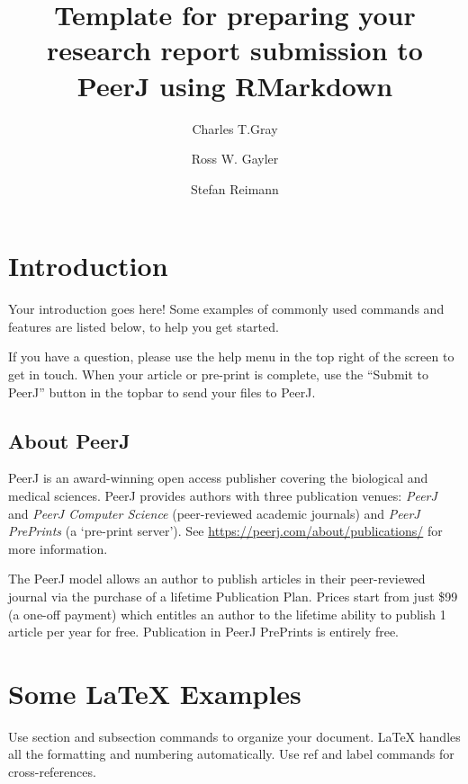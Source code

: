 \documentclass[fleqn,10pt,lineno]{wlpeerj} %
\title{Template for preparing your research report submission to PeerJ using RMarkdown}
\author[1]{Charles T.Gray}
\author[2]{Ross W. Gayler}
\author[3]{Stefan Reimann}
\affil[1]{Charles' institution address, Australia}
\affil[2]{www.rossgayler.com}
\affil[3]{Stefan's institution address, Switzerland}
\begin{document}
\flushbottom
\maketitle
\thispagestyle{empty}

\hypertarget{introduction}{%
\section*{Introduction}\label{introduction}}

Your introduction goes here! Some examples of commonly used commands and features are listed below, to help you get started.

If you have a question, please use the help menu in the top right of the screen to get in touch. When your article or pre-print is complete, use the ``Submit to PeerJ'' button in the topbar to send your files to PeerJ.

\hypertarget{about-peerj}{%
\subsection*{About PeerJ}\label{about-peerj}}

PeerJ is an award-winning open access publisher covering the biological and medical sciences. PeerJ provides authors with three publication venues: \emph{PeerJ} and \emph{PeerJ Computer Science} (peer-reviewed academic journals) and \emph{PeerJ PrePrints} (a `pre-print server'). See \url{https://peerj.com/about/publications/} for more information.

The PeerJ model allows an author to publish articles in their peer-reviewed journal via the purchase of a lifetime Publication Plan. Prices start from just \$99 (a one-off payment) which entitles an author to the lifetime ability to publish 1 article per year for free. Publication in PeerJ PrePrints is entirely free.

\hypertarget{some-examples}{%
\section*{\texorpdfstring{Some \LaTeX{} Examples}{Some  Examples}}\label{some-examples}}

Use section and subsection commands to organize your document. \LaTeX{} handles all the formatting and numbering automatically. Use ref and label commands for cross-references.
\end{document}
